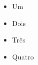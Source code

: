 \begin{itemize}
   \item<1-> Um
   \item<2-> Dois
   \item<3-> Três
   \item<4-> Quatro
\end{itemize}